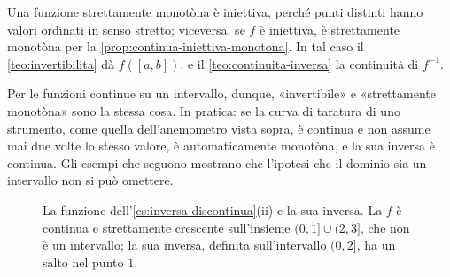 \begin{dimostrazione}
Una funzione strettamente monotòna è iniettiva, perché punti distinti hanno valori
ordinati in senso stretto; viceversa, se $f$ è iniettiva, è strettamente monotòna per la
\cref{prop:continua-iniettiva-monotona}. In tal caso il \cref{teo:invertibilita} dà
$f([a,b])$, e il \cref{teo:continuita-inversa} la continuità di $f^{-1}$.
\end{dimostrazione}

Per le funzioni continue su un intervallo, dunque, «invertibile» e «strettamente
monotòna» sono la stessa cosa. In pratica: se la curva di taratura di uno strumento, come
quella dell'anemometro vista sopra, è continua e non assume mai due volte lo stesso
valore, è automaticamente monotòna, e la sua inversa è continua. Gli esempi che seguono
mostrano che l'ipotesi che il dominio sia un intervallo non si può omettere.

\begin{figure}[htb]
\centering
{}\hfill
{}
\caption{La funzione dell'\cref{es:inversa-discontinua}(ii) e la sua inversa. La $f$ è
continua e strettamente crescente sull'insieme $(0,1]\cup(2,3]$, che non è un
intervallo; la sua inversa, definita sull'intervallo $(0,2]$, ha un salto nel punto
$1$.}
\label{fig:inversa-discontinua}
\end{figure}

